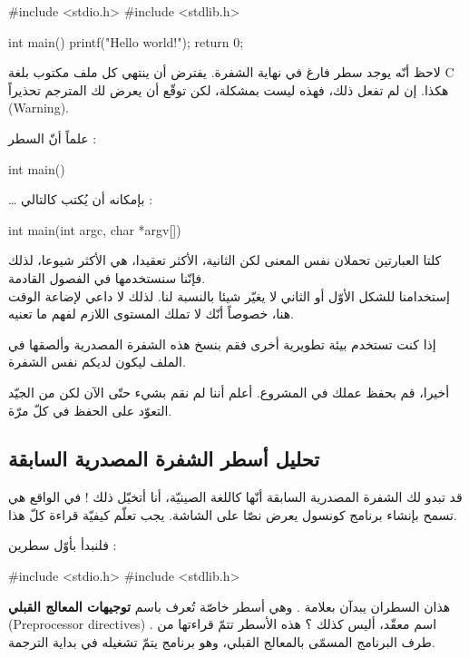 \begin{Csource}
#include <stdio.h>
#include <stdlib.h>

int main()
{
    printf("Hello world!\n");
    return 0;
}

\end{Csource}

\begin{information}
لاحظ أنّه يوجد سطر فارغ في نهاية الشفرة. يفترض أن ينتهي كل ملف مكتوب بلغة
\textenglish{C}
هكذا. إن لم تفعل ذلك، فهذه ليست بمشكلة، لكن توقّع أن يعرض لك المترجم تحذيراً
(\textenglish{Warning}).
\end{information}

علماً أنّ السطر :
\begin{Csource}
  int main()
\end{Csource}
\dots
بإمكانه أن يُكتب كالتالي :
\begin{Csource}
  int main(int argc, char *argv[])
\end{Csource}

كلتا العبارتين تحملان نفس المعنى لكن الثانية، الأكثر تعقيدا، هي الأكثر شيوعا، لذلك فإنّنا سنستخدمها في الفصول القادمة.\\
إستخدامنا للشكل الأوّل أو الثاني لا يغيّر شيئا بالنسبة لنا. لذلك لا داعي لإضاعة الوقت هنا، خصوصاً أنّك لا تملك المستوى اللازم لفهم ما تعنيه.

إذا كنت تستخدم بيئة تطويرية أخرى فقم بنسخ هذه الشفرة المصدرية وألصقها في الملف  ليكون لديكم نفس الشفرة.

أخيرا، قم بحفظ عملك في المشروع. أعلم أننا لم نقم بشيء حتّى الآن لكن من الجيّد التعوّد على الحفظ في كلّ مرّة.

\subsection{تحليل أسطر الشفرة المصدرية السابقة}
قد تبدو لك الشفرة المصدرية السابقة أنّها كاللغة الصينيّة، أنا أتخيّل ذلك ! في الواقع هي تسمح بإنشاء برنامج كونسول يعرض نصّا على الشاشة. يجب تعلّم كيفيّة قراءة كلّ هذا.

فلنبدأ بأوّل سطرين :
\begin{Csource}
#include <stdio.h>
#include <stdlib.h>
\end{Csource}

هذان السطران يبدآن بعلامة
\InlineCode{\#}.
وهي أسطر خاصّة تُعرف باسم
\textbf{توجيهات المعالج القبلي}
(\textenglish{Preprocessor directives})
. اسم معقّد، أليس كذلك ؟ هذه الأسطر تتمّ قراءتها من طرف البرنامج المسمّى بالمعالج القبلي، وهو برنامج يتمّ تشغيله في بداية الترجمة.

